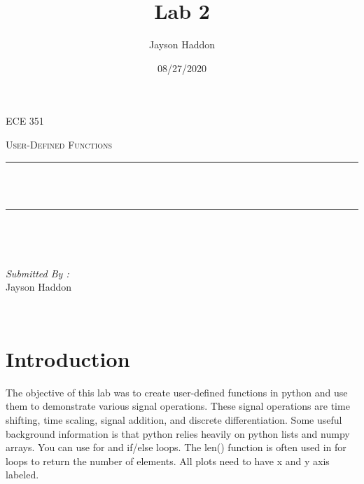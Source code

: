 \documentclass[11pt,a4]{report}
\title{Lab 2}
\author{Jayson Haddon}
\date{08/27/2020}
\makeatletter
\let\thetitle\@title
\makeatother
\begin{document}

\begin{titlepage}
	\centering
    \vspace*{0.5 cm}
\begin{center}    \textsc{\Large   ECE 351 }\\[2.0 cm]	\end{center}%
	\textsc{\Large User-Defined Functions  }\\[0.5 cm]				%
	\rule{\linewidth}{0.2 mm} \\[0.4 cm]
	{ \huge \bfseries \thetitle}\\
	\rule{\linewidth}{0.2 mm} \\[1.5 cm]
	
	\begin{minipage}{0.4\textwidth}
		\begin{flushleft} \large
			\end{flushleft}
			\end{minipage}~
			\begin{minipage}{0.4\textwidth}
            
			\begin{flushright} \large
			\emph{Submitted By :} \\
			Jayson Haddon  
		\end{flushright}
           
	\end{minipage}\\[2 cm]
	
    
    
    
    
	
\end{titlepage}

\tableofcontents
\pagebreak

\renewcommand{\thesection}{\arabic{section}}
\section{Introduction}
The objective of this lab was to create user-defined functions in python and use them to demonstrate various signal operations. These signal operations are time shifting, time scaling, signal addition, and discrete differentiation. Some useful background information is that python relies heavily on python lists and numpy arrays. You can use for and if/else loops. The len() function is often used in for loops to return the number of elements. All plots need to have x and y axis labeled. 
\end{document}
